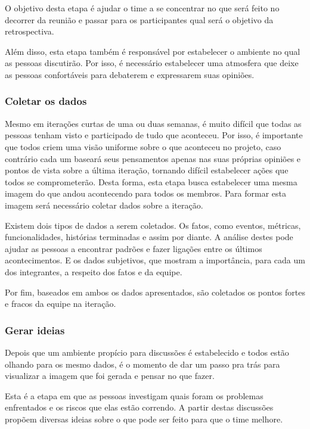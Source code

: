 O objetivo desta etapa é ajudar o time a se concentrar no que será feito no decorrer da reunião e passar para os participantes qual será o objetivo da retrospectiva.

Além disso, esta etapa também é responsável por estabelecer o ambiente no qual as pessoas discutirão. Por isso, é necessário estabelecer uma atmosfera que deixe as pessoas confortáveis para debaterem e expressarem suas opiniões.

\subsubsection*{Coletar os dados}

Mesmo em iterações curtas de uma ou duas semanas, é muito difícil que todas as pessoas tenham visto e participado de tudo que aconteceu. Por isso, é importante que todos criem uma visão uniforme sobre o que aconteceu no projeto, caso contrário cada um baseará seus pensamentos apenas nas suas próprias opiniões e pontos de vista sobre a última iteração, tornando difícil estabelecer ações que todos se comprometerão. Desta forma, esta etapa busca estabelecer uma mesma imagem do que andou acontecendo para todos os membros. Para formar esta imagem será necessário coletar dados sobre a iteração.

Existem dois tipos de dados a serem coletados. Os fatos, como eventos, métricas, funcionalidades, histórias terminadas e assim por diante. A análise destes pode ajudar as pessoas a encontrar padrões e fazer ligações entre os últimos acontecimentos. E os dados subjetivos, que mostram a importância, para cada um dos integrantes, a respeito dos fatos e da equipe. 

Por fim, baseados em ambos os dados apresentados, são coletados os pontos fortes e fracos da equipe na iteração.

\subsubsection*{Gerar ideias}

Depois que um ambiente propício para discussões é estabelecido e todos estão olhando para os mesmo dados, é o momento de dar um passo pra trás para visualizar a imagem que foi gerada e pensar no que fazer. 

Esta é a etapa em que as pessoas investigam quais foram os problemas enfrentados e os riscos que elas estão correndo. A partir destas discussões propõem diversas ideias sobre o que pode ser feito para que o time melhore.

